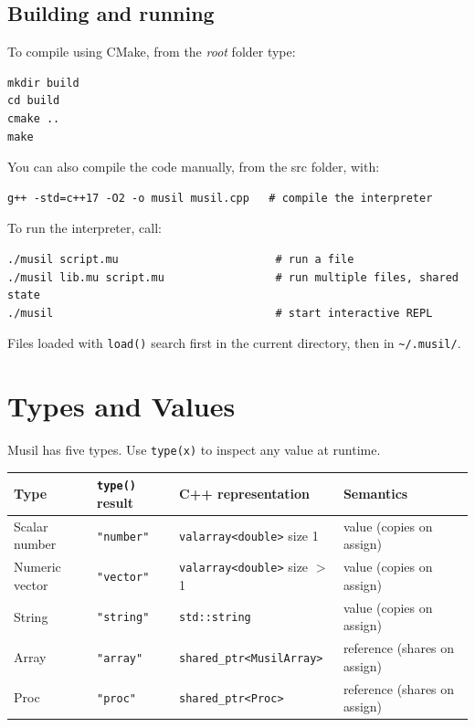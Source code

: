 \documentclass[11pt,a4paper]{article}
\newcommand{\musil}[1]{\lstinline[style=musilinline]{#1}}
\begin{document}
\subsection*{Building and running}
To compile using CMake, from the \emph{root} folder type:
\begin{lstlisting}[style=musil, numbers=none]
mkdir build
cd build
cmake ..
make
\end{lstlisting}

You can also compile the code manually, from the {src} folder, with:
\begin{lstlisting}[style=musil, numbers=none]
g++ -std=c++17 -O2 -o musil musil.cpp   # compile the interpreter
\end{lstlisting}

To run the interpreter, call: 
\begin{lstlisting}[style=musil, numbers=none]
./musil script.mu                        # run a file
./musil lib.mu script.mu                 # run multiple files, shared state
./musil                                  # start interactive REPL
\end{lstlisting}

Files loaded with \musil{load()} search first in the current directory, then in \texttt{\textasciitilde/.musil/}.

\section{Types and Values}
\label{sec:types}

Musil has five types. Use \musil{type(x)} to inspect any value at runtime.

\begin{center}
\begin{tabular}{@{}llll@{}}
\toprule
\textbf{Type} & \texttt{type()} result & \textbf{C++ representation} & \textbf{Semantics} \\
\midrule
Scalar number  & \texttt{"number"}  & \texttt{valarray<double>} size 1   & value (copies on assign) \\
Numeric vector & \texttt{"vector"}  & \texttt{valarray<double>} size $>$1 & value (copies on assign) \\
String         & \texttt{"string"}  & \texttt{std::string}               & value (copies on assign) \\
Array          & \texttt{"array"}   & \texttt{shared\_ptr<MusilArray>}    & reference (shares on assign) \\
Proc           & \texttt{"proc"}    & \texttt{shared\_ptr<Proc>}         & reference (shares on assign) \\
\bottomrule
\end{tabular}
\end{center}
\end{document}
